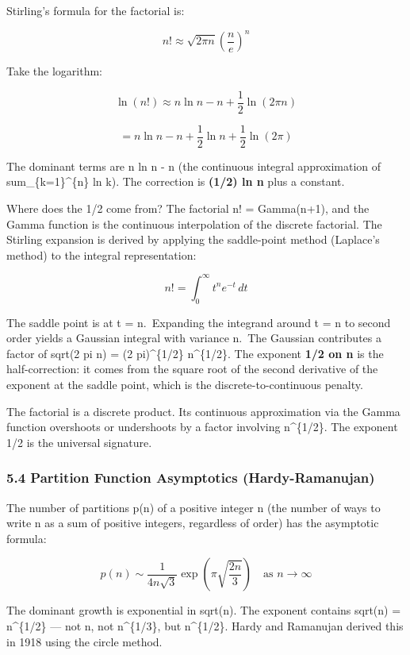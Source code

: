 \documentclass[
]{article}
\begin{document}
Stirling's formula for the factorial is:

\[n! \approx \sqrt{2\pi n} \left(\frac{n}{e}\right)^n\]

Take the logarithm:

\[\ln(n!) \approx n\ln n - n + \frac{1}{2}\ln(2\pi n)\]

\[= n\ln n - n + \frac{1}{2}\ln n + \frac{1}{2}\ln(2\pi)\]

The dominant terms are n ln n - n (the continuous integral approximation
of sum\_\{k=1\}\^{}\{n\} ln k). The correction is \textbf{(1/2) ln n}
plus a constant.

Where does the 1/2 come from? The factorial n! = Gamma(n+1), and the
Gamma function is the continuous interpolation of the discrete
factorial. The Stirling expansion is derived by applying the
saddle-point method (Laplace's method) to the integral representation:

\[n! = \int_0^\infty t^n e^{-t} \, dt\]

The saddle point is at t = n.~Expanding the integrand around t = n to
second order yields a Gaussian integral with variance n.~The Gaussian
contributes a factor of sqrt(2 pi n) = (2 pi)\^{}\{1/2\} n\^{}\{1/2\}.
The exponent \textbf{1/2 on n} is the half-correction: it comes from the
square root of the second derivative of the exponent at the saddle
point, which is the discrete-to-continuous penalty.

The factorial is a discrete product. Its continuous approximation via
the Gamma function overshoots or undershoots by a factor involving
n\^{}\{1/2\}. The exponent 1/2 is the universal signature.

\subsubsection{5.4 Partition Function Asymptotics
(Hardy-Ramanujan)}\label{partition-function-asymptotics-hardy-ramanujan}

The number of partitions p(n) of a positive integer n (the number of
ways to write n as a sum of positive integers, regardless of order) has
the asymptotic formula:

\[p(n) \sim \frac{1}{4n\sqrt{3}} \exp\!\left(\pi\sqrt{\frac{2n}{3}}\right) \quad \text{as } n \to \infty\]

The dominant growth is exponential in sqrt(n). The exponent contains
sqrt(n) = n\^{}\{1/2\} --- not n, not n\^{}\{1/3\}, but n\^{}\{1/2\}.
Hardy and Ramanujan derived this in 1918 using the circle method.
\end{document}
